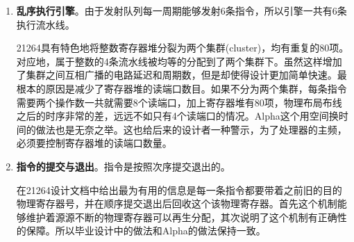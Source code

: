 \begin{enumerate}[label=(\alph*)]
	一个周期最多能够取回4条指令，先锁存一个周期，然后在CAM形式的重命名表中进行重命名和寄存器的分配。需要注意的是，和MIPS一样，Alpha在重命名阶段要特殊处理条件移动指令的映射关系。重命名完毕消除了写后写和读后写的冲突，但是依旧保留了写后读冲突。之后将指令写入发射队列中。发射队列采用分离式，分为整数指令队列和浮点指令队列，最多可以动态发射出6条指令，四条整数指令，两条浮点指令。使用记分牌来判断指令的操作数是否准备就绪。发射的细节上，微结构上有一个20项的定点队列和一个15项的浮点队列，队列只发射的是那些操作数都已经准备好的指令。与此同时，队列由仲裁器来决定填入新的指令。上述模块的逻辑可以由图\ref{fig:rename_21264}直观的描述。
	\begin{figure}[!htbp]
		\centering
		\texttt{[image: rename]}
		\label{fig:rename_21264}
	\end{figure}
	上图中有一个Saved map state模块，非常重要，它的作用是在转移预测错误时恢复处理器的状态。注意该表有80项，也即每一条指令分配一项，这样处理器可以从任何一条指令之后精确地恢复状态，而不会受到跳转指令数量的约束。但是缺点是非常消耗资源。当然不光是转移预测错误的恢复，例外中断的状态恢复同样也是用这个表的，但和分支预测错误的恢复机制略有不同。
	\item \textbf{乱序执行引擎}。由于发射队列每一周期能够发射6条指令，所以引擎一共有6条执行流水线。
	
	21264具有特色地将整数寄存器堆分裂为两个集群(cluster)，均有重复的80项。对应地，属于整数的4条流水线被均等的分配到了两个集群下。虽然这样增加了集群之间互相广播的电路延迟和周期数，但是却使得设计更加简单快速。最根本的原因是减少了寄存器堆的读端口数目。如果不分为两个集群，每条指令需要两个操作数一共就需要8个读端口，加上寄存器堆有80项，物理布局布线之后的时序非常的差，远远不如只有4个读端口的情况。Alpha这个用空间换时间的做法也是无奈之举。这也给后来的设计者一种警示，为了处理器的主频，必须要控制寄存器堆的读端口数量。
	\item \textbf{指令的提交与退出}。指令是按照次序提交退出的。
	
	在21264设计文档中给出最为有用的信息是每一条指令都要带着之前旧的目的物理寄存器号，并在顺序提交退出后回收这个该物理寄存器。首先这个机制能够维护着源源不断的物理寄存器可以再生分配，其次说明了这个机制有正确性的保障。所以毕业设计中的做法和Alpha的做法保持一致。


\end{enumerate}
